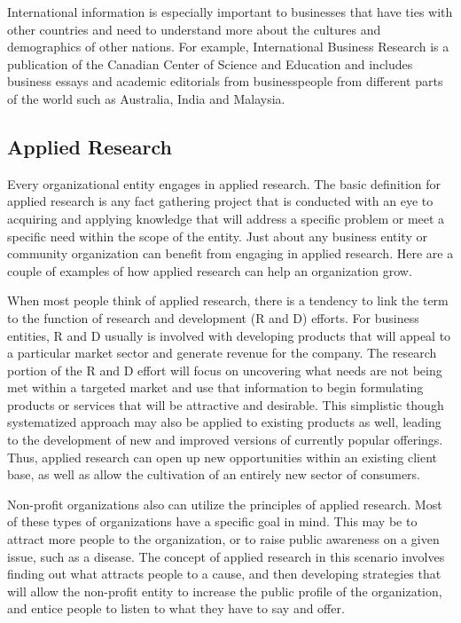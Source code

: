 \documentclass[12pt, a4paper]{report}
\begin{document}
International information is especially important to businesses that have ties with other countries and need to understand more about the cultures and demographics of other nations. For example, International Business Research is a publication of the Canadian Center of Science and Education and includes business essays and academic editorials from businesspeople from different parts of the world such as Australia, India and Malaysia.
\subsection{Applied Research}
Every organizational entity engages in applied research. The basic definition for applied research is any fact gathering project that is conducted with an eye to acquiring and applying knowledge that will address a specific problem or meet a specific need within the scope of the entity. Just about any business entity or community organization can benefit from engaging in applied research. Here are a couple of examples of how applied research can help an organization grow.

When most people think of applied research, there is a tendency to link the term to the function of research and development (R and D) efforts. For business entities, R and D usually is involved with developing products that will appeal to a particular market sector and generate revenue for the company. The research portion of the R and D effort will focus on uncovering what needs are not being met within a targeted market and use that information to begin formulating products or services that will be attractive and desirable. This simplistic though systematized approach may also be applied to existing products as well, leading to the development of new and improved versions of currently popular offerings. Thus, applied research can open up new opportunities within an existing client base, as well as allow the cultivation of an entirely new sector of consumers.

Non-profit organizations also can utilize the principles of applied research. Most of these types of organizations have a specific goal in mind. This may be to attract more people to the organization, or to raise public awareness on a given issue, such as a disease. The concept of applied research in this scenario involves finding out what attracts people to a cause, and then developing strategies that will allow the non-profit entity to increase the public profile of the organization, and entice people to listen to what they have to say and offer.
\end{document}
